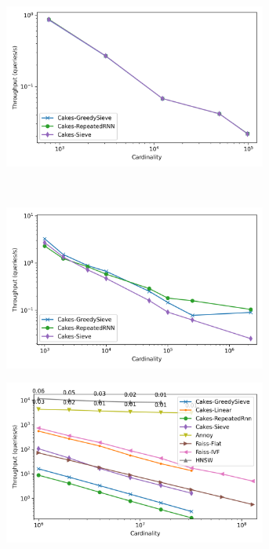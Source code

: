 \begin{figure}
\begin{subfigure}[b]{0.47\textwidth}
\label{fig:results:sift-scaling}
\end{subfigure}%
\begin{subfigure}[b]{0.47\textwidth}
\includegraphics[width=0.95\textwidth]{plots/radio-ml-knn-10.png}
\label{fig:results:radioml-scaling}
\end{subfigure}%
\vspace{1em}
\\
\begin{subfigure}[b]{0.47\textwidth}
\includegraphics[width=0.95\textwidth]{plots/silva-knn-10.png}
\label{fig:results:silva-scaling}
\end{subfigure}%
\begin{subfigure}[b]{0.47\textwidth}
\includegraphics[width=0.95\textwidth]{plots/random-knn-10.png}

\end{subfigure}
\end{figure}
